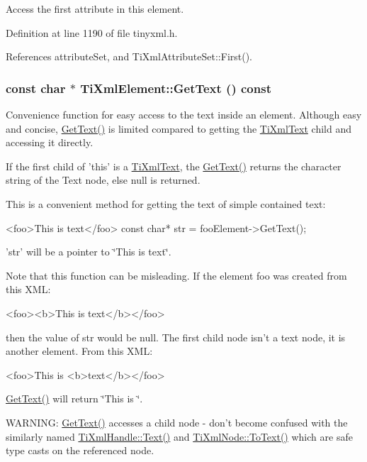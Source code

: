Access the first attribute in this element. 

Definition at line 1190 of file tinyxml.h.

References attributeSet, and TiXmlAttributeSet::First().\hypertarget{class_ti_xml_element_aa6dedd8a146acf3b1bc0903deb2d411a}{
\subsubsection[{GetText}]{\setlength{\rightskip}{0pt plus 5cm}const char $\ast$ TiXmlElement::GetText () const}}
\label{class_ti_xml_element_aa6dedd8a146acf3b1bc0903deb2d411a}
Convenience function for easy access to the text inside an element. Although easy and concise, \hyperlink{class_ti_xml_element_aa6dedd8a146acf3b1bc0903deb2d411a}{GetText()} is limited compared to getting the \hyperlink{class_ti_xml_text}{TiXmlText} child and accessing it directly.

If the first child of 'this' is a \hyperlink{class_ti_xml_text}{TiXmlText}, the \hyperlink{class_ti_xml_element_aa6dedd8a146acf3b1bc0903deb2d411a}{GetText()} returns the character string of the Text node, else null is returned.

This is a convenient method for getting the text of simple contained text: \begin{DoxyVerb}
      <foo>This is text</foo>
      const char* str = fooElement->GetText();
      \end{DoxyVerb}


'str' will be a pointer to \char`\"{}This is text\char`\"{}.

Note that this function can be misleading. If the element foo was created from this XML: \begin{DoxyVerb}
      <foo><b>This is text</b></foo>
      \end{DoxyVerb}


then the value of str would be null. The first child node isn't a text node, it is another element. From this XML: \begin{DoxyVerb}
      <foo>This is <b>text</b></foo>
      \end{DoxyVerb}
 \hyperlink{class_ti_xml_element_aa6dedd8a146acf3b1bc0903deb2d411a}{GetText()} will return \char`\"{}This is \char`\"{}.

WARNING: \hyperlink{class_ti_xml_element_aa6dedd8a146acf3b1bc0903deb2d411a}{GetText()} accesses a child node -\/ don't become confused with the similarly named \hyperlink{class_ti_xml_handle_a9fc739c8a18d160006f82572fc143d13}{TiXmlHandle::Text()} and \hyperlink{class_ti_xml_node_a3ddfbcac78fbea041fad57e5c6d60a03}{TiXmlNode::ToText()} which are safe type casts on the referenced node. 

